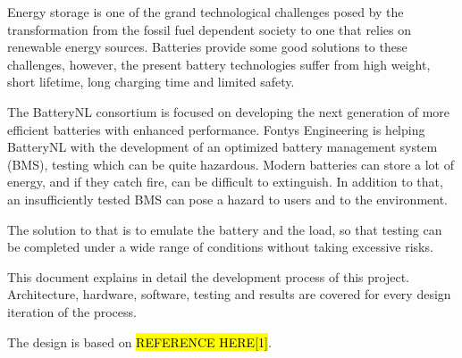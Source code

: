 \IEEEPARstart
{E}{nergy} storage is one of the grand technological challenges posed by the transformation from the
fossil fuel dependent society to one that relies on renewable energy sources. Batteries provide
some good solutions to these challenges, however, the present battery technologies suffer from
high weight, short lifetime, long charging time and limited safety.

The BatteryNL consortium is focused on developing the next generation of more efficient
batteries with enhanced performance. Fontys Engineering is helping BatteryNL with the development 
of an optimized battery management system (BMS), testing which can be quite
hazardous. Modern batteries can store a lot of energy, and if they catch fire, can be difficult to
extinguish. In addition to that, an insufficiently tested BMS can pose a hazard to users and to
the environment.

The solution to that is to emulate the battery and the load, so that testing can be completed
under a wide range of conditions without taking excessive risks.

This document explains in detail the development process of this project. Architecture, hardware, software, testing 
and results are covered for every design iteration of the process. 

The design is based on \hl{REFERENCE HERE[1]}.